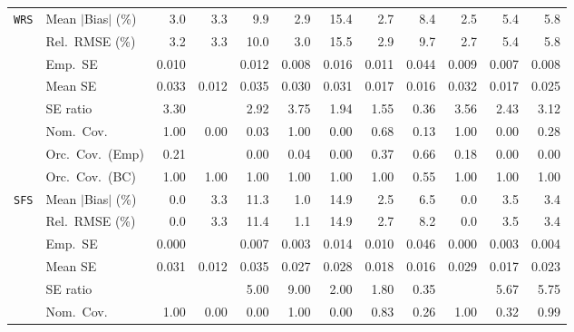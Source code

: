 \begin{landscape}
\begin{longtable}{llrrrrrrrrrr}
\addlinespace[2pt]
\quad \texttt{WRS} & Mean $|$Bias$|$ (\%) & 3.0 & 3.3 & 9.9 & \cellcolor{rankthree}2.9 & 15.4 & \cellcolor{ranktwo}2.7 & 8.4 & \cellcolor{rankone}2.5 & 5.4 & 5.8 \\
 & Rel.\ RMSE (\%) & 3.2 & 3.3 & 10.0 & \cellcolor{rankthree}3.0 & 15.5 & \cellcolor{ranktwo}2.9 & 9.7 & \cellcolor{rankone}2.7 & 5.4 & 5.8 \\
 & Emp.\ SE & 0.010 &  & 0.012 & 0.008 & 0.016 & 0.011 & 0.044 & 0.009 & 0.007 & 0.008 \\
 & Mean SE & 0.033 & 0.012 & 0.035 & 0.030 & 0.031 & 0.017 & 0.016 & 0.032 & 0.017 & 0.025 \\
 & SE ratio & 3.30 &  & 2.92 & 3.75 & \cellcolor{rankthree}1.94 & \cellcolor{rankone}1.55 & \cellcolor{ranktwo}0.36 & 3.56 & 2.43 & 3.12 \\
 & Nom.\ Cov. & \cellcolor{rankone}1.00 & 0.00 & 0.03 & \cellcolor{rankone}1.00 & 0.00 & \cellcolor{ranktwo}0.68 & 0.13 & \cellcolor{rankone}1.00 & 0.00 & \cellcolor{rankthree}0.28 \\
 & Orc.\ Cov.\ (Emp) & \cellcolor{rankthree}0.21 &  & 0.00 & 0.04 & 0.00 & \cellcolor{ranktwo}0.37 & \cellcolor{rankone}0.66 & 0.18 & 0.00 & 0.00 \\
 & Orc.\ Cov.\ (BC) & \cellcolor{rankone}1.00 & \cellcolor{rankone}1.00 & \cellcolor{rankone}1.00 & \cellcolor{rankone}1.00 & \cellcolor{rankone}1.00 & \cellcolor{rankone}1.00 & \cellcolor{ranktwo}0.55 & \cellcolor{rankone}1.00 & \cellcolor{rankone}1.00 & \cellcolor{rankone}1.00 \\
\addlinespace[2pt]
\quad \texttt{SFS} & Mean $|$Bias$|$ (\%) & \cellcolor{rankone}0.0 & 3.3 & 11.3 & \cellcolor{ranktwo}1.0 & 14.9 & \cellcolor{rankthree}2.5 & 6.5 & \cellcolor{rankone}0.0 & 3.5 & 3.4 \\
 & Rel.\ RMSE (\%) & \cellcolor{rankone}0.0 & 3.3 & 11.4 & \cellcolor{ranktwo}1.1 & 14.9 & \cellcolor{rankthree}2.7 & 8.2 & \cellcolor{rankone}0.0 & 3.5 & 3.4 \\
 & Emp.\ SE & 0.000 &  & 0.007 & 0.003 & 0.014 & 0.010 & 0.046 & 0.000 & 0.003 & 0.004 \\
 & Mean SE & 0.031 & 0.012 & 0.035 & 0.027 & 0.028 & 0.018 & 0.016 & 0.029 & 0.017 & 0.023 \\
 & SE ratio &  &  & 5.00 & 9.00 & \cellcolor{rankthree}2.00 & \cellcolor{ranktwo}1.80 & \cellcolor{rankone}0.35 &  & 5.67 & 5.75 \\
 & Nom.\ Cov. & \cellcolor{ranktwo}1.00 & 0.00 & 0.00 & \cellcolor{ranktwo}1.00 & 0.00 & \cellcolor{rankthree}0.83 & 0.26 & \cellcolor{ranktwo}1.00 & 0.32 & \cellcolor{rankone}0.99 \\

\end{longtable}
\end{landscape}
